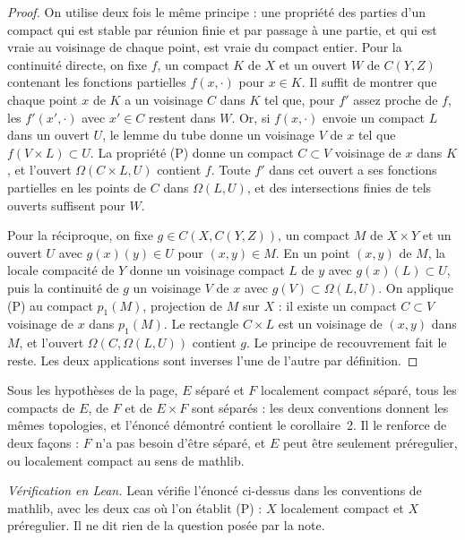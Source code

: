 \begin{proof}
On utilise deux fois le même principe : une propriété des parties d'un compact qui est stable par réunion finie et par passage à une partie, et qui est vraie au voisinage de chaque point, est vraie du compact entier. Pour la continuité directe, on fixe $f$, un compact $K$ de $X$ et un ouvert $W$ de $C(Y, Z)$ contenant les fonctions partielles $f(x, \cdot)$ pour $x \in K$. Il suffit de montrer que chaque point $x$ de $K$ a un voisinage $C$ dans $K$ tel que, pour $f'$ assez proche de $f$, les $f'(x', \cdot)$ avec $x' \in C$ restent dans $W$. Or, si $f(x, \cdot)$ envoie un compact $L$ dans un ouvert $U$, le lemme du tube donne un voisinage $V$ de $x$ tel que $f(V \times L) \subset U$. La propriété (P) donne un compact $C \subset V$ voisinage de $x$ dans $K$, et l'ouvert $\Omega(C \times L, U)$ contient $f$. Toute $f'$ dans cet ouvert a ses fonctions partielles en les points de $C$ dans $\Omega(L, U)$, et des intersections finies de tels ouverts suffisent pour $W$.

Pour la réciproque, on fixe $g \in C(X, C(Y, Z))$, un compact $M$ de $X \times Y$ et un ouvert $U$ avec $g(x)(y) \in U$ pour $(x, y) \in M$. En un point $(x, y)$ de $M$, la locale compacité de $Y$ donne un voisinage compact $L$ de $y$ avec $g(x)(L) \subset U$, puis la continuité de $g$ un voisinage $V$ de $x$ avec $g(V) \subset \Omega(L, U)$. On applique (P) au compact $p_1(M)$, projection de $M$ sur $X$ : il existe un compact $C \subset V$ voisinage de $x$ dans $p_1(M)$. Le rectangle $C \times L$ est un voisinage de $(x, y)$ dans $M$, et l'ouvert $\Omega(C, \Omega(L, U))$ contient $g$. Le principe de recouvrement fait le reste. Les deux applications sont inverses l'une de l'autre par définition.
\end{proof}

\begin{remarque}
Sous les hypothèses de la page, $E$ séparé et $F$ localement compact séparé, tous les compacts de $E$, de $F$ et de $E \times F$ sont séparés : les deux conventions donnent les mêmes topologies, et l'énoncé démontré contient le corollaire~2. Il le renforce de deux façons : $F$ n'a pas besoin d'être séparé, et $E$ peut être seulement préregulier, ou localement compact au sens de mathlib.
\end{remarque}

\emph{Vérification en Lean.} Lean vérifie l'énoncé ci-dessus dans les conventions de mathlib, avec les deux cas où l'on établit (P) : $X$ localement compact et $X$ préregulier. Il ne dit rien de la question posée par la note.

